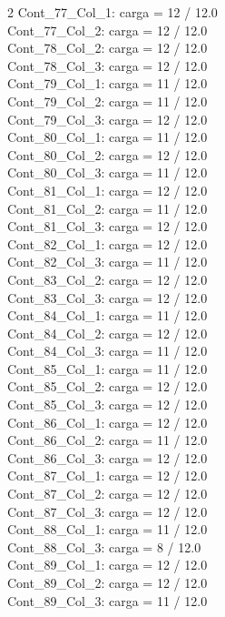 \begin{multicols}{2}
Cont\_77\_Col\_1: carga = 12 / 12.0\\
Cont\_77\_Col\_2: carga = 12 / 12.0\\
Cont\_78\_Col\_2: carga = 12 / 12.0\\
Cont\_78\_Col\_3: carga = 12 / 12.0\\
Cont\_79\_Col\_1: carga = 11 / 12.0\\
Cont\_79\_Col\_2: carga = 11 / 12.0\\
Cont\_79\_Col\_3: carga = 12 / 12.0\\
Cont\_80\_Col\_1: carga = 11 / 12.0\\
Cont\_80\_Col\_2: carga = 12 / 12.0\\
Cont\_80\_Col\_3: carga = 11 / 12.0\\
Cont\_81\_Col\_1: carga = 12 / 12.0\\
Cont\_81\_Col\_2: carga = 11 / 12.0\\
Cont\_81\_Col\_3: carga = 12 / 12.0\\
Cont\_82\_Col\_1: carga = 12 / 12.0\\
Cont\_82\_Col\_3: carga = 11 / 12.0\\
Cont\_83\_Col\_2: carga = 12 / 12.0\\
Cont\_83\_Col\_3: carga = 12 / 12.0\\
Cont\_84\_Col\_1: carga = 11 / 12.0\\
Cont\_84\_Col\_2: carga = 12 / 12.0\\
Cont\_84\_Col\_3: carga = 11 / 12.0\\
Cont\_85\_Col\_1: carga = 11 / 12.0\\
Cont\_85\_Col\_2: carga = 12 / 12.0\\
Cont\_85\_Col\_3: carga = 12 / 12.0\\
Cont\_86\_Col\_1: carga = 12 / 12.0\\
Cont\_86\_Col\_2: carga = 11 / 12.0\\
Cont\_86\_Col\_3: carga = 12 / 12.0\\
Cont\_87\_Col\_1: carga = 12 / 12.0\\
Cont\_87\_Col\_2: carga = 12 / 12.0\\
Cont\_87\_Col\_3: carga = 12 / 12.0\\
Cont\_88\_Col\_1: carga = 11 / 12.0\\
Cont\_88\_Col\_3: carga = 8 / 12.0\\
Cont\_89\_Col\_1: carga = 12 / 12.0\\
Cont\_89\_Col\_2: carga = 12 / 12.0\\
Cont\_89\_Col\_3: carga = 11 / 12.0\\

\end{multicols}
